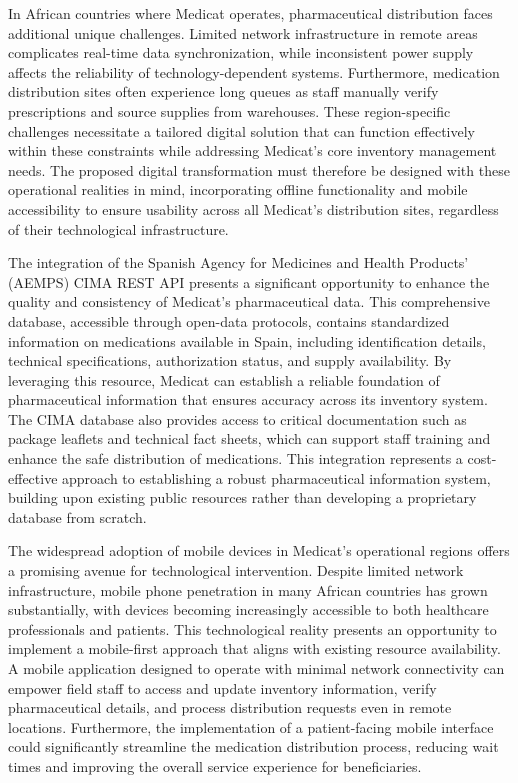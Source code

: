 \documentclass[
]{report}
\begin{document}
In African countries where Medicat operates, pharmaceutical distribution
faces additional unique challenges. Limited network infrastructure in
remote areas complicates real-time data synchronization, while
inconsistent power supply affects the reliability of
technology-dependent systems. Furthermore, medication distribution sites
often experience long queues as staff manually verify prescriptions and
source supplies from warehouses. These region-specific challenges
necessitate a tailored digital solution that can function effectively
within these constraints while addressing Medicat's core inventory
management needs. The proposed digital transformation must therefore be
designed with these operational realities in mind, incorporating offline
functionality and mobile accessibility to ensure usability across all
Medicat's distribution sites, regardless of their technological
infrastructure.

The integration of the Spanish Agency for Medicines and Health Products'
(AEMPS) CIMA REST API presents a significant opportunity to enhance the
quality and consistency of Medicat's pharmaceutical data. This
comprehensive database, accessible through open-data protocols, contains
standardized information on medications available in Spain, including
identification details, technical specifications, authorization status,
and supply availability. By leveraging this resource, Medicat can
establish a reliable foundation of pharmaceutical information that
ensures accuracy across its inventory system. The CIMA database also
provides access to critical documentation such as package leaflets and
technical fact sheets, which can support staff training and enhance the
safe distribution of medications. This integration represents a
cost-effective approach to establishing a robust pharmaceutical
information system, building upon existing public resources rather than
developing a proprietary database from scratch.

The widespread adoption of mobile devices in Medicat's operational
regions offers a promising avenue for technological intervention.
Despite limited network infrastructure, mobile phone penetration in many
African countries has grown substantially, with devices becoming
increasingly accessible to both healthcare professionals and patients.
This technological reality presents an opportunity to implement a
mobile-first approach that aligns with existing resource availability. A
mobile application designed to operate with minimal network connectivity
can empower field staff to access and update inventory information,
verify pharmaceutical details, and process distribution requests even in
remote locations. Furthermore, the implementation of a patient-facing
mobile interface could significantly streamline the medication
distribution process, reducing wait times and improving the overall
service experience for beneficiaries.
\end{document}
